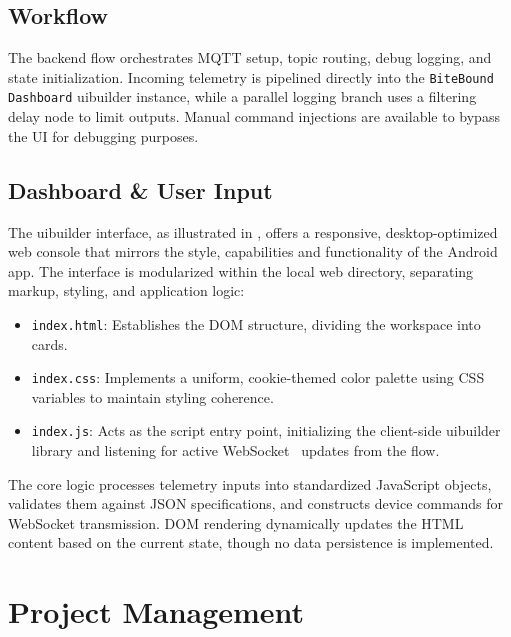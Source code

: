 \documentclass[10pt,journal,final,a4paper]{IEEEtran}
\begin{document}
\subsection{Workflow}
\label{subsec:workflow}

The backend flow orchestrates MQTT setup, topic routing, debug logging, and state initialization. %
Incoming telemetry is pipelined directly into the \texttt{BiteBound Dashboard} uibuilder instance, while a parallel logging branch uses a filtering delay node to limit outputs.
Manual command injections are available to bypass the UI for debugging purposes.

\subsection{Dashboard \& User Input}
\label{subsec:dashboard_nodered}

The uibuilder interface, as illustrated in , offers a responsive, desktop-optimized web console that mirrors the style, capabilities and functionality of the Android app.
The interface is modularized within the local web directory, separating markup, styling, and application logic:

\begin{itemize}
    \item \texttt{index.html}: Establishes the DOM structure, dividing the workspace into cards.
    \item  \texttt{index.css}: Implements a uniform, cookie-themed color palette using CSS variables to maintain styling coherence.
    \item \texttt{index.js}: Acts as the script entry point, initializing the client-side uibuilder library and listening for active WebSocket~\cite{uibuilderv7} updates from the flow.
\end{itemize}

The core logic processes telemetry inputs into standardized JavaScript objects, validates them against JSON specifications, and constructs device commands for WebSocket transmission. DOM rendering dynamically updates the HTML content based on the current state, though no data persistence is implemented.

\section{Project Management}
\label{sec:project_management}
\end{document}
